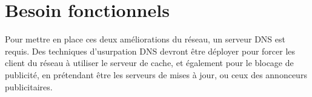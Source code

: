 \documentclass[14pt,a4paper]{extarticle}
\begin{document}
\section{Besoin fonctionnels}
Pour mettre en place ces deux améliorations du réseau, un serveur DNS est requis. Des techniques d'usurpation DNS devront être déployer pour forcer les client du réseau à utiliser le serveur de cache, et également pour le blocage de publicité, en prétendant être les serveurs de mises à jour, ou ceux des annonceurs publicitaires.
\end{document}

